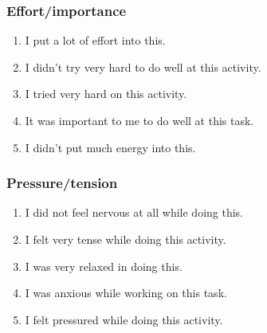 \subsubsection*{Effort/importance}\label{imi2}
\begin{enumerate}
\item \begin{minipage}[t]{\linewidth}
I put a lot of effort into this.
\end{minipage}
\item \begin{minipage}[t]{\linewidth}
I didn't try very hard to do well at this activity.
\end{minipage}
\item \begin{minipage}[t]{\linewidth}
I tried very hard on this activity.
\end{minipage}
\item \begin{minipage}[t]{\linewidth}
It was important to me to do well at this task.
\end{minipage}
\item \begin{minipage}[t]{\linewidth}
I didn't put much energy into this.
\end{minipage}
\end{enumerate}
\subsubsection*{Pressure/tension}\label{imi3}
\begin{enumerate}
\item \begin{minipage}[t]{\linewidth}
I did not feel nervous at all while doing this.
\end{minipage}
\item \begin{minipage}[t]{\linewidth}
I felt very tense while doing this activity.
\end{minipage}
\item \begin{minipage}[t]{\linewidth}
I was very relaxed in doing this.
\end{minipage}
\item \begin{minipage}[t]{\linewidth}
I was anxious while working on this task.
\end{minipage}
\item \begin{minipage}[t]{\linewidth}
I felt pressured while doing this activity.
\end{minipage}
\end{enumerate}
